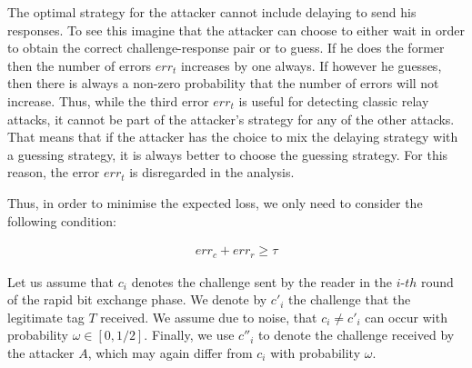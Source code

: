 \documentclass{article}
\newcommand \thr {\tau}
\newcommand \noise {\omega}
\begin{document}
The optimal strategy for the attacker cannot include delaying to send his responses.
To see this imagine that the attacker can choose to either wait in order to obtain the correct challenge-response pair or to guess. If he does the former then the number of errors $err_{t}$ increases by one always. If however he guesses, then there is always a non-zero probability that the number of errors will not increase.
Thus, while the third error $err_{t}$ is useful for detecting classic relay attacks, it cannot be part of the attacker's strategy for any of the other attacks. That means that if the attacker has the choice to mix the delaying strategy with a guessing strategy, it is always better to choose the guessing strategy. For this reason, the error $err_{t}$ is disregarded in the analysis.


Thus, in order to minimise the expected loss, we only need to consider the following condition:

\begin{align}
err_{c}+err_{r} \geq \thr
\end{align}

Let us assume that $c_{i}$ denotes the challenge sent by the reader in
the $i$-${th}$ round of the rapid bit exchange phase. We denote by
$c'_{i}$ the challenge that the legitimate tag $T$ received. We assume
due to noise, that $c_{i} \neq c'_{i}$ can occur with probability $\noise
\in [0, 1/2]$.  Finally, we use $c''_{i}$ to denote the challenge
received by the attacker $A$, which may again differ from $c_{i}$ with
probability $\noise$.
\end{document}
